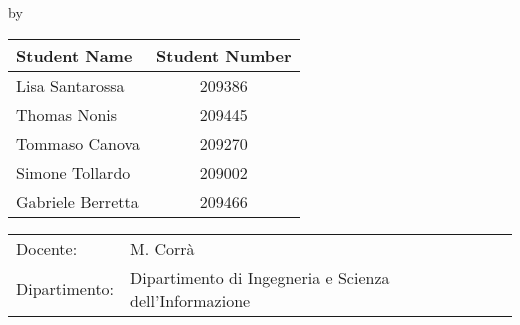 \begin{titlepage}

\begin{center}

{\makeatletter
\largetitlestyle\fontsize{35}{35}\selectfont\@title
\makeatother}

{\makeatletter
\ifdefvoid{\@subtitle}{}{\bigskip\bigskip\qquad \; \titlestyle\fontsize{15}{15}\selectfont\@subtitle}
\makeatother}

\bigskip
\bigskip

by
 
\bigskip
\bigskip

\setlength\extrarowheight{2pt}
\begin{tabular}{lc}
    Student Name & Student Number \\\midrule
    Lisa Santarossa & 209386\\
    Thomas Nonis & 209445\\
    Tommaso Canova & 209270\\
    Simone Tollardo & 209002\\
    Gabriele Berretta & 209466 \\
\end{tabular}

\vfill

\begin{tabular}{ll}
    Docente: & M. Corrà \\
    Dipartimento: & Dipartimento di Ingegneria e Scienza dell'Informazione
\end{tabular}

\bigskip
\bigskip

\end{center}

\end{titlepage}
